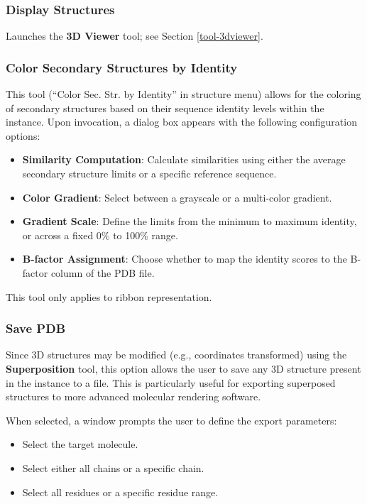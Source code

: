 \documentclass[a4paper]{article}
\begin{document}
\subsubsection{Display Structures}
Launches the \textbf{3D Viewer} tool; see Section \ref{tool-3dviewer}.

\subsubsection{Color Secondary Structures by Identity}
This tool (``Color Sec. Str. by Identity'' in structure menu) allows for the coloring of secondary structures based on their sequence identity levels within the instance. Upon invocation, a dialog box appears with the following configuration options:
\begin{itemize}
    \item \textbf{Similarity Computation}: Calculate similarities using either the average secondary structure limits or a specific reference sequence.
    \item \textbf{Color Gradient}: Select between a grayscale or a multi-color gradient.
    \item \textbf{Gradient Scale}: Define the limits from the minimum to maximum identity, or across a fixed 0\% to 100\% range.
    \item \textbf{B-factor Assignment}: Choose whether to map the identity scores to the B-factor column of the PDB file.
\end{itemize}
This tool only applies to ribbon representation.
\subsubsection{Save PDB}
Since 3D structures may be modified (e.g., coordinates transformed) using the \textbf{Superposition} tool, this option allows the user to save any 3D structure present in the instance to a file. This is particularly useful for exporting superposed structures to more advanced molecular rendering software.

When selected, a window prompts the user to define the export parameters:
\begin{itemize}
    \item Select the target molecule.
    \item Select either all chains or a specific chain.
    \item Select all residues or a specific residue range.
\end{itemize}
\end{document}
